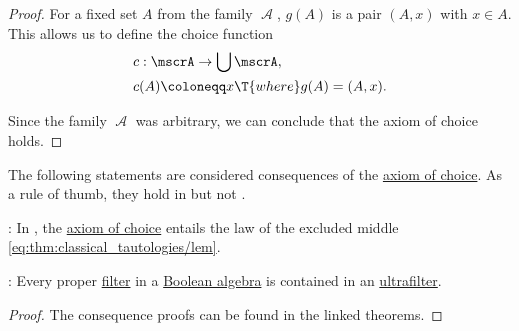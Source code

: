 \begin{proof}
  For a fixed set \( A \) from the family \( \mscrA \), \( g(A) \) is a pair \( (A, x) \) with \( x \in A \). This allows us to define the choice function
  \begin{equation*}
    \begin{aligned}
      &c: \mscrA \to \bigcup \mscrA, \\
      &c(A) \coloneqq x \T{where} g(A) = (A, x).
    \end{aligned}
  \end{equation*}

  Since the family \( \mscrA \) was arbitrary, we can conclude that the axiom of choice holds.
\end{proof}

\begin{theorem}\label{thm:axiom_of_choice_consequences}
  The following statements are considered consequences of the \hyperref[def:zfc/choice]{axiom of choice}. As a rule of thumb, they hold in \hyperref[def:zfc]{} but not .

  \begin{thmenum}
     : In \hyperref[def:zfc]{}, the \hyperref[def:zfc/choice]{axiom of choice} entails the law of the excluded middle \eqref{eq:thm:classical_tautologies/lem}.

     : Every proper \hyperref[def:lattice_ideal]{filter} in a \hyperref[def:boolean_algebra]{Boolean algebra} is contained in an \hyperref[def:ultrafilter]{ultrafilter}.
  \end{thmenum}
\end{theorem}
\begin{proof}
  The consequence proofs can be found in the linked theorems.
\end{proof}

